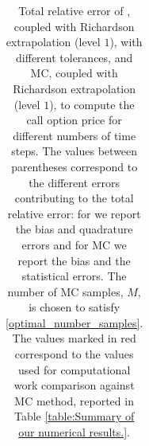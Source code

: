 \begin{table}[h!]
\begin{tabular}{l*{6}{c}r}
		\bottomrule[1.25pt]
	\end{tabular}
	\caption{Total relative error of , coupled with Richardson extrapolation (level $1$), with different tolerances,  and MC, coupled with Richardson extrapolation (level $1$), to compute the call option price  for different numbers of time steps. The values between parentheses correspond to the different errors contributing to the total relative error: for  we report the bias and quadrature errors and for MC we report the bias and the statistical errors. The number of MC samples, $M$, is chosen to satisfy \eqref{optimal_number_samples}. The values marked in red correspond to the values used for computational work comparison against MC method, reported in Table \ref{table:Summary of our numerical results.}.}
	\label{Total  error of MISC and MC to compute Call option price of the different tolerances for different number of time steps. Case set $2$ parameters, with Richardson extrapolation(level $1$). The numbers between parentheses are the corresponding absolute errors,relative}
\end{table}
\FloatBarrier


